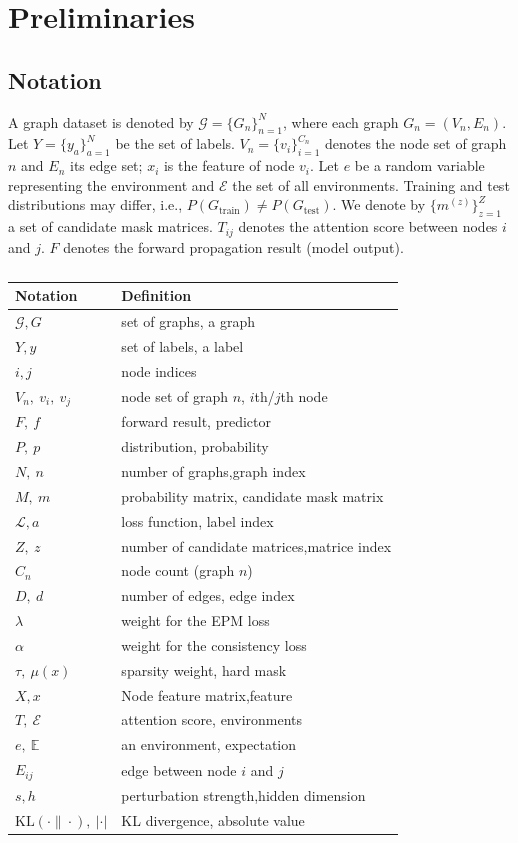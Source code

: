 \documentclass[a4paper,fleqn]{cas-dc}
\begin{document}
\section{Preliminaries}\label{}
\subsection{Notation}
{\color{blue}A graph dataset is denoted by $\mathcal{G}=\{G_n\}_{n=1}^N$, where each graph $G_n=(V_n,E_n)$. Let $Y=\{y_a\}_{a=1}^N$ be the set of labels. $V_n=\{v_i\}_{i=1}^{C_n}$ denotes the node set of graph $n$ and $E_n$ its edge set; $x_i$ is the feature of node $v_i$. Let $e$ be a random variable representing the environment and $\mathcal{E}$ the set of all environments. Training and test distributions may differ, i.e., $P(G_{\mathrm{train}})\neq P(G_{\mathrm{test}})$. We denote by $\{m^{(z)}\}_{z=1}^Z$ a set of candidate mask matrices. $T_{ij}$ denotes the attention score between nodes $i$ and $j$. $F$ denotes the forward propagation result (model output).}
\begin{table}[ht]
\centering
\caption{}
\label{tbl:notation_en}
\begin{tabular}{@{}ll@{}}
\toprule
\textbf{Notation} & Definition \\
\midrule
$\mathcal{G},G$ & set of graphs, a graph \\
$Y,y$ & set of labels, a label \\
$i,j$ & node indices \\
$V_n,\ v_i,\ v_j$ & node set of graph $n$, $i$th/$j$th node \\
$F,\ f$ & forward result, predictor \\
$P,\ p$ & distribution, probability \\
$N,\ n$ & number of graphs,graph index \\
$M,\ m$ & probability matrix, candidate mask matrix \\
$ \mathcal{L}, a$ &loss function, label index \\
$Z,\ z$ & number of candidate matrices,matrice index \\
$C_n$ & node count (graph $n$) \\
$D,\ d$ & number of edges, edge index \\
$\lambda$ & weight for the EPM loss \\
$\alpha$ & weight for the consistency loss \\
$\tau,\ \mu(x)$ & sparsity weight, hard mask \\
{\color{blue}$X, x$} & Node feature matrix,feature \\
$T,\ \mathcal{E}$ & attention score, environments \\
$e,\ \mathbb{E}$ & an environment, expectation \\
$E_{ij}$ & edge between node $i$ and $j$ \\
{\color{blue}$s, h\ $} & perturbation strength,hidden dimension    \\
$\mathrm{KL}(\cdot\|\cdot),\ |\cdot|$ & KL divergence, absolute value \\
\bottomrule
\end{tabular}
\end{table}
\end{document}
